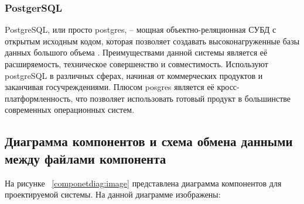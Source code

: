 \subsubsection{PostgerSQL} 


PostgreSQL, или просто postgres, –  мощная объектно-реляционная СУБД с открытым исходным кодом, которая позволяет создавать высоконагруженные базы данных большого объема \cite{postgrestermin}. Преимуществами данной системы является её расширяемость, техническое совершенство и совместимость. Используют postgreSQL в различных сферах, начиная от коммерческих продуктов и заканчивая госучреждениями. Плюсом posgres является её кросс-платформленность, что позволяет использовать готовый продукт в большинстве современных операционных систем.
	
	


\subsection{Диаграмма компонентов и схема обмена данными между файлами компонента}
На рисунке  ~\ref{componetdiag:image} представлена диаграмма компонентов для проектируемой системы\cite{components}. На данной диаграмме изображены:
